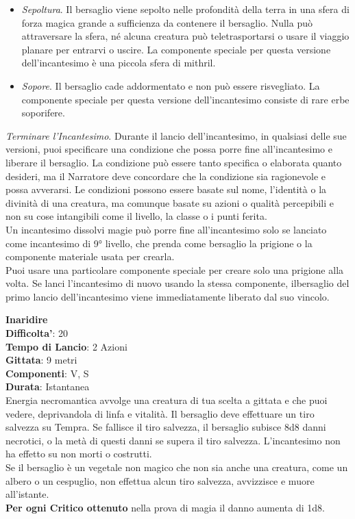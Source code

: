 \begin{multicols}{2}
\begin{itemize}
\item
\textit{Sepoltura}. Il bersaglio viene sepolto nelle profondità della terra in una sfera di forza magica grande a sufficienza da contenere il bersaglio. Nulla può attraversare la sfera, né alcuna creatura può teletrasportarsi o usare il viaggio planare per entrarvi o uscire. La componente speciale per questa versione dell’incantesimo è una piccola sfera di mithril. 
\item
\textit{Sopore}. Il bersaglio cade addormentato e non può essere risvegliato. La componente speciale per questa versione dell’incantesimo consiste di rare erbe soporifere.
\end{itemize}
\medskip
\textit{Terminare l’Incantesimo}. Durante il lancio dell’incantesimo, in qualsiasi delle sue versioni, puoi specificare una condizione che possa porre fine all’incantesimo e liberare il bersaglio. La condizione può essere tanto specifica o elaborata quanto desideri, ma il Narratore deve concordare che la condizione sia ragionevole e possa avverarsi. Le condizioni possono essere basate sul nome, l’identità o la divinità di una creatura, ma comunque basate su azioni o qualità percepibili e non su cose intangibili come il livello, la classe o i punti ferita.\\
Un incantesimo dissolvi magie può porre fine all’incantesimo solo se lanciato come incantesimo di 9° livello, che prenda come bersaglio la prigione o la componente materiale usata per crearla.\\
Puoi usare una particolare componente speciale per creare solo una prigione alla volta. Se lanci l’incantesimo di nuovo usando la stessa componente, ilbersaglio del primo lancio dell’incantesimo  viene immediatamente liberato dal suo vincolo.

\medskip\textbf{Inaridire}\\
\textbf{Difficolta'}: 20\\
\textbf{Tempo di Lancio}: 2 Azioni\\
\textbf{Gittata}: 9 metri\\
\textbf{Componenti}: V, S\\
\textbf{Durata}: Istantanea\\
Energia necromantica avvolge una creatura di tua scelta a gittata e che puoi vedere, deprivandola di linfa e vitalità. Il bersaglio deve effettuare un tiro salvezza su Tempra. Se fallisce il tiro  salvezza, il bersaglio subisce 8d8 danni necrotici, o la metà di questi danni se supera il tiro salvezza. L’incantesimo non ha effetto su non morti o costrutti.\\
Se il bersaglio è un vegetale non magico che non sia anche una creatura, come un albero o un cespuglio, non effettua alcun tiro salvezza, avvizzisce e muore all’istante.\\
\textbf{Per ogni Critico ottenuto} nella prova di magia il danno aumenta di 1d8.


\end{multicols}
